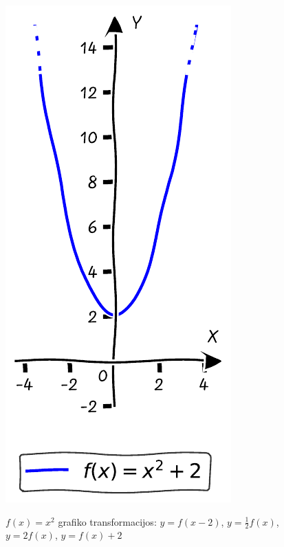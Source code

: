 \documentclass{tufte-handout}
\begin{document}
\begin{figure}[h]
\begin{minipage}{0.18\textwidth}
    \label{fig:third}
  \end{minipage}\hfill
  \begin{minipage}{0.18\textwidth}
    \includegraphics[width=\linewidth]{./graphs/quadratic_func_ush_2.pdf}
    \label{fig:fourth}
  \end{minipage}
  \caption{$f(x)=x^2$ grafiko transformacijos: $y=f(x-2)$, $y=\frac{1}{2}f(x)$,
    $y=2f(x)$, $y=f(x)+2$ }
\end{figure}
\end{document}
